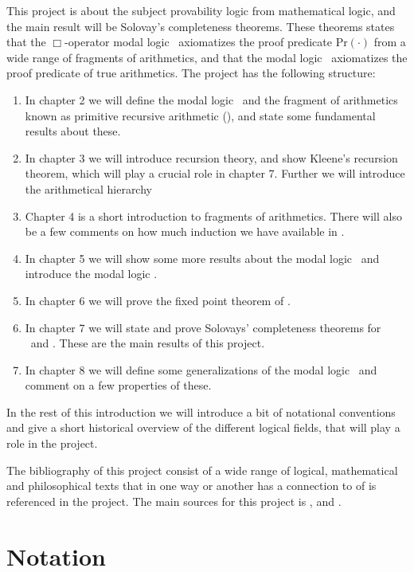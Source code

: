 \documentclass[../main.tex]{subfiles}
\begin{document}
This project is about the subject provability logic from mathematical logic,
and the main result will be Solovay's completeness theorems. These theorems
states that the $\Box$-operator  modal logic \GL\ axiomatizes the proof
predicate $\text{Pr}(\cdot)$ from a wide range of fragments of arithmetics, and
that the modal logic \GLS\ axiomatizes the proof predicate of true arithmetics.
The project has the following structure: 
\begin{enumerate}
	\item In chapter 2 we will define the modal logic \GL\ and the
		fragment of arithmetics known as primitive recursive
		arithmetic (\PRA), and state some fundamental results about these.
	\item In chapter 3 we will introduce recursion theory, and show
		Kleene's recursion theorem, which will play a crucial role in
		chapter 7. Further we will introduce the
		arithmetical hierarchy 
	\item Chapter 4 is a short introduction to fragments of arithmetics.
		There will also be a few comments on how much induction we have
		available  in \PRA.
	\item In chapter 5 we will show some more results about the modal logic \GL\
		and introduce the modal logic \GLS.
	\item In chapter 6 we will prove the fixed point theorem of \GL.
	\item In chapter 7 we will state and prove Solovays' completeness
		theorems for \GL\ and \GLS. These are the main results of this
		project.
	\item In chapter 8 we will define some generalizations of the modal
		logic \GL\ and comment on a few properties of these.
\end{enumerate}

In the rest of this introduction we will introduce a bit of notational
conventions and give a short historical overview of the different logical
fields, that will play a role in the project.

The bibliography of this project consist of a wide range of logical,
mathematical and philosophical texts that in one way or another has a
connection to of is referenced in the project. The main sources for this project
is \cite{Smor1985}, \cite{Boolos1993} and \cite{Soare1987}.

\section{Notation}
\end{document}
